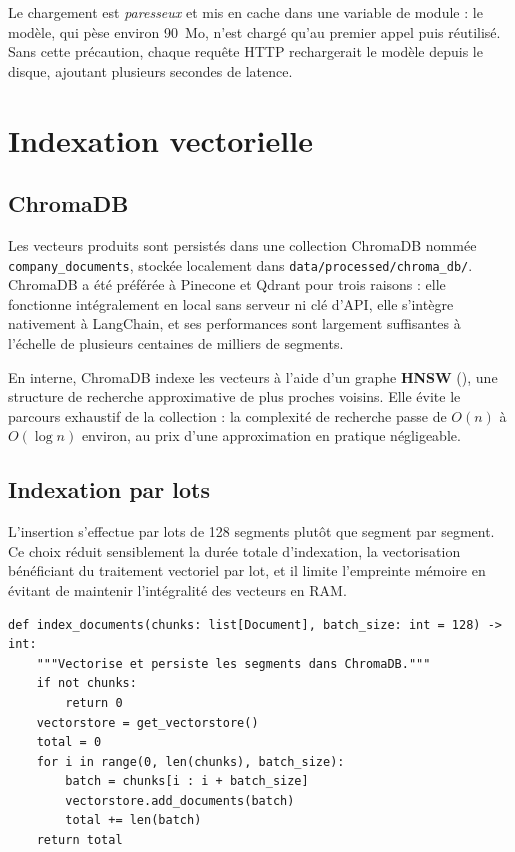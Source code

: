 Le chargement est \emph{paresseux} et mis en cache dans une variable de module :
le modèle, qui pèse environ 90~Mo, n'est chargé qu'au premier appel puis
réutilisé. Sans cette précaution, chaque requête HTTP rechargerait le modèle
depuis le disque, ajoutant plusieurs secondes de latence.

\section{Indexation vectorielle}

\subsection{ChromaDB}

Les vecteurs produits sont persistés dans une collection ChromaDB nommée
\texttt{company\_documents}, stockée localement dans
\texttt{data/processed/chroma\_db/}. ChromaDB a été préférée à Pinecone et Qdrant
pour trois raisons : elle fonctionne intégralement en local sans serveur ni clé
d'API, elle s'intègre nativement à LangChain, et ses performances sont largement
suffisantes à l'échelle de plusieurs centaines de milliers de segments.

En interne, ChromaDB indexe les vecteurs à l'aide d'un graphe \textbf{HNSW}
(), une structure de recherche
approximative de plus proches voisins. Elle évite le parcours exhaustif de la
collection : la complexité de recherche passe de $O(n)$ à
$O(\log n)$ environ, au prix d'une approximation en pratique négligeable.

\subsection{Indexation par lots}

L'insertion s'effectue par lots de 128 segments plutôt que segment par segment.
Ce choix réduit sensiblement la durée totale d'indexation, la vectorisation
bénéficiant du traitement vectoriel par lot, et il limite l'empreinte mémoire
en évitant de maintenir l'intégralité des vecteurs en RAM.

\begin{lstlisting}[style=python,caption={Indexation par lots (\texttt{src/ingestion/indexer.py})}]
def index_documents(chunks: list[Document], batch_size: int = 128) -> int:
    """Vectorise et persiste les segments dans ChromaDB."""
    if not chunks:
        return 0
    vectorstore = get_vectorstore()
    total = 0
    for i in range(0, len(chunks), batch_size):
        batch = chunks[i : i + batch_size]
        vectorstore.add_documents(batch)
        total += len(batch)
    return total
\end{lstlisting}

